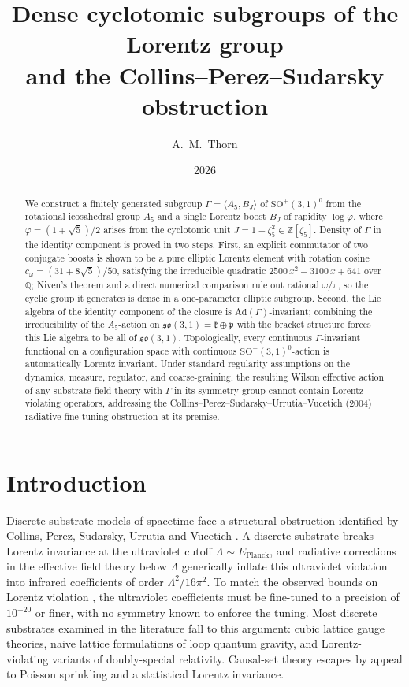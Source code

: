 \documentclass[11pt]{article}
\title{Dense cyclotomic subgroups of the Lorentz group\\
and the Collins--Perez--Sudarsky obstruction}
\author{A.~M.~Thorn}
\date{2026}
\theoremstyle{remark}
\begin{document}
\maketitle

\begin{abstract}
We construct a finitely generated subgroup
$\Gamma = \langle A_5, B_J\rangle$ of $\mathrm{SO}^+(3,1)^0$ from the
rotational icosahedral group $A_5$ and a single Lorentz boost $B_J$
of rapidity $\log\varphi$, where $\varphi = (1+\sqrt{5})/2$ arises
from the cyclotomic unit $J = 1 + \zeta_5^2 \in \mathbb{Z}[\zeta_5]$.
Density of $\Gamma$ in the identity component is proved in two steps.
First, an explicit commutator of two conjugate boosts is shown to be
a pure elliptic Lorentz element with rotation cosine
$c_\omega = (31 + 8\sqrt{5})/50$, satisfying the irreducible quadratic
$2500\,x^2 - 3100\,x + 641$ over $\mathbb{Q}$; Niven's theorem and a
direct numerical comparison rule out rational $\omega/\pi$, so the
cyclic group it generates is dense in a one-parameter elliptic
subgroup. Second, the Lie algebra of the identity component of the
closure is $\mathrm{Ad}(\Gamma)$-invariant; combining the
irreducibility of the $A_5$-action on
$\mathfrak{so}(3,1) = \mathfrak{k} \oplus \mathfrak{p}$ with the
bracket structure forces this Lie algebra to be all of
$\mathfrak{so}(3,1)$. Topologically, every continuous
$\Gamma$-invariant functional on a configuration space with
continuous $\mathrm{SO}^+(3,1)^0$-action is automatically Lorentz
invariant. Under standard regularity assumptions on the dynamics,
measure, regulator, and coarse-graining, the resulting Wilson
effective action of any substrate field theory with $\Gamma$ in its
symmetry group cannot contain Lorentz-violating operators, addressing
the Collins--Perez--Sudarsky--Urrutia--Vucetich (2004) radiative
fine-tuning obstruction at its premise.
\end{abstract}


\section{Introduction}

Discrete-substrate models of spacetime face a structural obstruction
identified by Collins, Perez, Sudarsky, Urrutia and Vucetich
\cite{CPSUV04}. A discrete substrate breaks Lorentz invariance at the
ultraviolet cutoff $\Lambda \sim E_{\mathrm{Planck}}$, and radiative
corrections in the effective field theory below $\Lambda$ generically
inflate this ultraviolet violation into infrared coefficients of order
$\Lambda^2 / 16\pi^2$. To match the observed bounds on Lorentz
violation \cite{Mattingly05,LiberatiReview}, the ultraviolet
coefficients must be fine-tuned to a precision of $10^{-20}$ or finer,
with no symmetry known to enforce the tuning. Most discrete substrates
examined in the literature fall to this argument: cubic lattice gauge
theories, naive lattice formulations of loop quantum gravity, and
Lorentz-violating variants of doubly-special relativity. Causal-set
theory \cite{BHS87} escapes by appeal to Poisson sprinkling and a
statistical Lorentz invariance.
\end{document}
